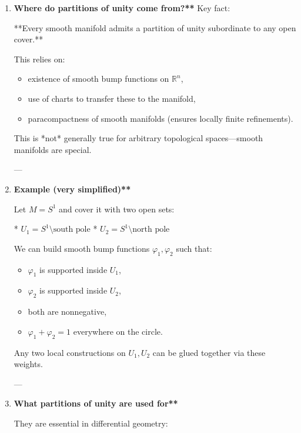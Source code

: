 \documentclass[10pt,a4paper]{report}
\begin{document}
\begin{enumerate}
\begin{itemize}
\end{itemize}
This is the manifold version of using bump functions to smoothly interpolate between definitions.

---

\item \textbf{Where do partitions of unity come from?**
}
Key fact:

**Every smooth manifold admits a partition of unity subordinate to any open cover.**

This relies on:

\begin{itemize}

\item  existence of smooth bump functions on $\mathbb R^n$,
\item  use of charts to transfer these to the manifold,
\item  paracompactness of smooth manifolds (ensures locally finite refinements).

\end{itemize}
This is *not* generally true for arbitrary topological spaces—smooth manifolds are special.

---

\item \textbf{Example (very simplified)**}

Let $M = S^1$ and cover it with two open sets:

* $U_1 = S^1 \setminus {\text{south pole}}$
* $U_2 = S^1 \setminus {\text{north pole}}$

We can build smooth bump functions $\varphi_1,\varphi_2$ such that:

\begin{itemize}

\item  $\varphi_1$ is supported inside $U_1$,
\item  $\varphi_2$ is supported inside $U_2$,
\item  both are nonnegative,
\item  $\varphi_1 + \varphi_2 = 1$ everywhere on the circle.

\end{itemize}
Any two local constructions on $U_1,U_2$ can be glued together via these weights.

---

\item \textbf{What partitions of unity are used for**}

They are essential in differential geometry:


\end{enumerate}
\end{document}
